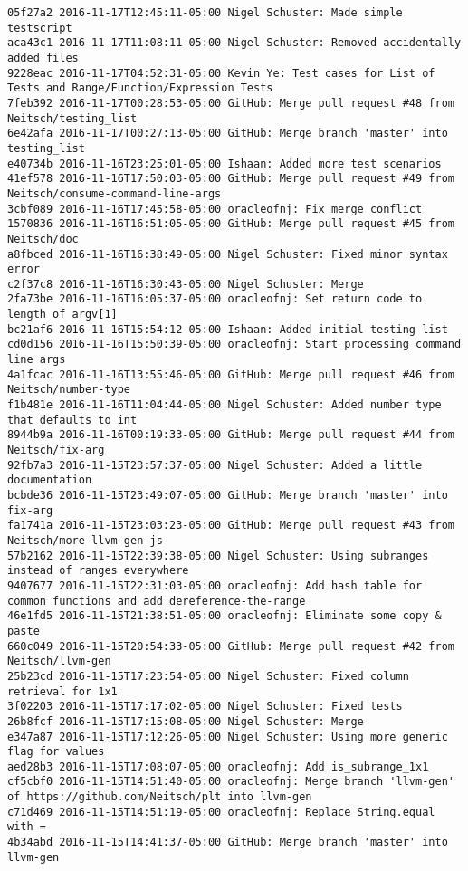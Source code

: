 \begin{lstlisting}
05f27a2 2016-11-17T12:45:11-05:00 Nigel Schuster: Made simple testscript
aca43c1 2016-11-17T11:08:11-05:00 Nigel Schuster: Removed accidentally added files
9228eac 2016-11-17T04:52:31-05:00 Kevin Ye: Test cases for List of Tests and Range/Function/Expression Tests
7feb392 2016-11-17T00:28:53-05:00 GitHub: Merge pull request #48 from Neitsch/testing_list
6e42afa 2016-11-17T00:27:13-05:00 GitHub: Merge branch 'master' into testing_list
e40734b 2016-11-16T23:25:01-05:00 Ishaan: Added more test scenarios
41ef578 2016-11-16T17:50:03-05:00 GitHub: Merge pull request #49 from Neitsch/consume-command-line-args
3cbf089 2016-11-16T17:45:58-05:00 oracleofnj: Fix merge conflict
1570836 2016-11-16T16:51:05-05:00 GitHub: Merge pull request #45 from Neitsch/doc
a8fbced 2016-11-16T16:38:49-05:00 Nigel Schuster: Fixed minor syntax error
c2f37c8 2016-11-16T16:30:43-05:00 Nigel Schuster: Merge
2fa73be 2016-11-16T16:05:37-05:00 oracleofnj: Set return code to length of argv[1]
bc21af6 2016-11-16T15:54:12-05:00 Ishaan: Added initial testing list
cd0d156 2016-11-16T15:50:39-05:00 oracleofnj: Start processing command line args
4a1fcac 2016-11-16T13:55:46-05:00 GitHub: Merge pull request #46 from Neitsch/number-type
f1b481e 2016-11-16T11:04:44-05:00 Nigel Schuster: Added number type that defaults to int
8944b9a 2016-11-16T00:19:33-05:00 GitHub: Merge pull request #44 from Neitsch/fix-arg
92fb7a3 2016-11-15T23:57:37-05:00 Nigel Schuster: Added a little documentation
bcbde36 2016-11-15T23:49:07-05:00 GitHub: Merge branch 'master' into fix-arg
fa1741a 2016-11-15T23:03:23-05:00 GitHub: Merge pull request #43 from Neitsch/more-llvm-gen-js
57b2162 2016-11-15T22:39:38-05:00 Nigel Schuster: Using subranges instead of ranges everywhere
9407677 2016-11-15T22:31:03-05:00 oracleofnj: Add hash table for common functions and add dereference-the-range
46e1fd5 2016-11-15T21:38:51-05:00 oracleofnj: Eliminate some copy & paste
660c049 2016-11-15T20:54:33-05:00 GitHub: Merge pull request #42 from Neitsch/llvm-gen
25b23cd 2016-11-15T17:23:54-05:00 Nigel Schuster: Fixed column retrieval for 1x1
3f02203 2016-11-15T17:17:02-05:00 Nigel Schuster: Fixed tests
26b8fcf 2016-11-15T17:15:08-05:00 Nigel Schuster: Merge
e347a87 2016-11-15T17:12:26-05:00 Nigel Schuster: Using more generic flag for values
aed28b3 2016-11-15T17:08:07-05:00 oracleofnj: Add is_subrange_1x1
cf5cbf0 2016-11-15T14:51:40-05:00 oracleofnj: Merge branch 'llvm-gen' of https://github.com/Neitsch/plt into llvm-gen
c71d469 2016-11-15T14:51:19-05:00 oracleofnj: Replace String.equal with =
4b34abd 2016-11-15T14:41:37-05:00 GitHub: Merge branch 'master' into llvm-gen

\end{lstlisting}
